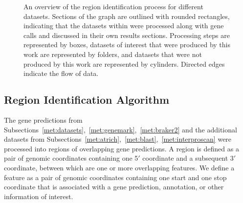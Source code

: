 \begin{figure}
  \centering
  \caption[Region identification workflow]{An overview of the region identification process for
    different datasets. Sections of the graph are outlined with
    rounded rectangles, indicating that the datasets within were processed
    along with gene calls and discussed in their own results
    sections. Processing steps are represented by boxes, datasets of
    interest that were produced by this work are represented by
    folders, and datasets that were not produced by this work are
    represented by cylinders. Directed edges indicate the flow of
    data.}\label{fig:region-overview}
\end{figure}


\subsection{Region Identification Algorithm}\label{section:region-met}

The gene predictions from Subsections~\ref{met:datasets},~\ref{met:genemark},~\ref{met:braker2} and the additional datasets from Subsections~\ref{met:atrich},~\ref{met:blast},~\ref{met:interproscan} were processed into regions of overlapping gene predictions. A region is defined as a pair of genomic coordinates containing one 5$'$ coordinate and a subsequent 3$'$ coordinate, between which are one or more overlapping features.
We define a feature as a pair of genomic
coordinates containing one start and one stop coordinate that is
associated with a gene prediction, annotation, or other information of
interest.

